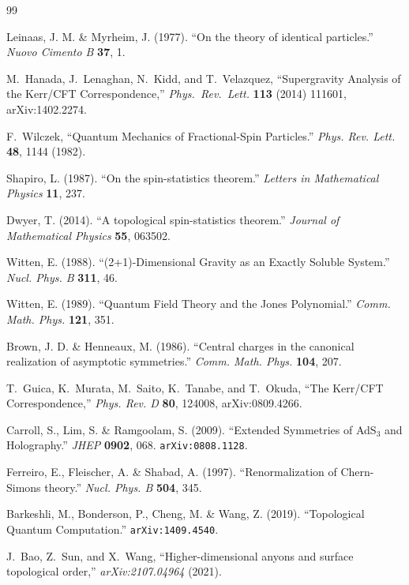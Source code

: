 \documentclass[11pt,a4paper]{article}
\begin{document}
\begin{thebibliography}{99}

Leinaas, J. M. \& Myrheim, J. (1977).
``On the theory of identical particles.''
\textit{Nuovo Cimento B} \textbf{37}, 1.

M.~Hanada, J.~Lenaghan, N.~Kidd, and T.~Velazquez,
``Supergravity Analysis of the Kerr/CFT Correspondence,''
\textit{Phys.\ Rev.\ Lett.} \textbf{113} (2014) 111601, arXiv:1402.2274.

F.~Wilczek,
``Quantum Mechanics of Fractional-Spin Particles.''
\textit{Phys. Rev. Lett.} \textbf{48}, 1144 (1982).

Shapiro, L. (1987).
``On the spin-statistics theorem.''
\textit{Letters in Mathematical Physics} \textbf{11}, 237.

Dwyer, T. (2014).
``A topological spin-statistics theorem.''
\textit{Journal of Mathematical Physics} \textbf{55}, 063502.

Witten, E. (1988).
``(2+1)-Dimensional Gravity as an Exactly Soluble System.''
\textit{Nucl. Phys. B} \textbf{311}, 46.

Witten, E. (1989).
``Quantum Field Theory and the Jones Polynomial.''
\textit{Comm. Math. Phys.} \textbf{121}, 351.

Brown, J. D. \& Henneaux, M. (1986).
``Central charges in the canonical realization of asymptotic symmetries.''
\textit{Comm. Math. Phys.} \textbf{104}, 207.

T.~Guica, K.~Murata, M.~Saito, K.~Tanabe, and T.~Okuda,
``The Kerr/CFT Correspondence,''
\textit{Phys. Rev. D} \textbf{80}, 124008, arXiv:0809.4266.

Carroll, S., Lim, S. \& Ramgoolam, S. (2009).
``Extended Symmetries of AdS$_3$ and Holography.''
\textit{JHEP} \textbf{0902}, 068.
\texttt{arXiv:0808.1128}.

Ferreiro, E., Fleischer, A. \& Shabad, A. (1997).
``Renormalization of Chern-Simons theory.''
\textit{Nucl. Phys. B} \textbf{504}, 345.

Barkeshli, M., Bonderson, P., Cheng, M. \& Wang, Z. (2019).
``Topological Quantum Computation.''
\texttt{arXiv:1409.4540}.

J.~Bao, Z.~Sun, and X.~Wang,
``Higher-dimensional anyons and surface topological order,''
\textit{arXiv:2107.04964} (2021).


\end{thebibliography}
\end{document}
